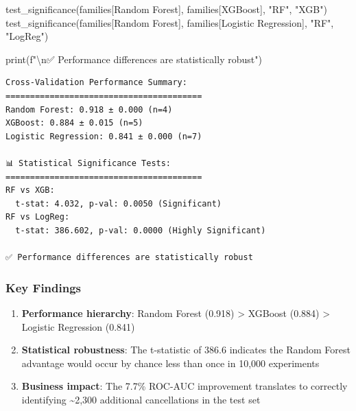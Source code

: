\documentclass[
  letterpaper,
  DIV=11,
  numbers=noendperiod]{scrartcl}
\newenvironment{Shaded}{\begin{snugshade}}{\end{snugshade}}
\newcommand{\BuiltInTok}[1]{\textcolor[rgb]{0.00,0.23,0.31}{#1}}
\newcommand{\CharTok}[1]{\textcolor[rgb]{0.13,0.47,0.30}{#1}}
\newcommand{\NormalTok}[1]{\textcolor[rgb]{0.00,0.23,0.31}{#1}}
\newcommand{\SpecialStringTok}[1]{\textcolor[rgb]{0.13,0.47,0.30}{#1}}
\newcommand{\StringTok}[1]{\textcolor[rgb]{0.13,0.47,0.30}{#1}}
\renewenvironment{Shaded}{%
  \begin{tcolorbox}[%
    enhanced,%
    colback=codebg,%
    colframe=codebg,%
    borderline west={3pt}{0pt}{sectionblue},%
    fontupper=\small\ttfamily,%
    boxrule=0pt,%
    arc=0pt,%
    boxsep=5pt,%
    left=2mm,%
    right=2mm,%
    top=2mm,%
    bottom=2mm%
  ]%
}{%
  \end{tcolorbox}%
}
\begin{document}
\begin{Shaded}
\begin{Highlighting}[]
\NormalTok{test\_significance(families[}\StringTok{\textquotesingle{}Random Forest\textquotesingle{}}\NormalTok{], families[}\StringTok{\textquotesingle{}XGBoost\textquotesingle{}}\NormalTok{], }
                 \StringTok{"RF"}\NormalTok{, }\StringTok{"XGB"}\NormalTok{)}
\NormalTok{test\_significance(families[}\StringTok{\textquotesingle{}Random Forest\textquotesingle{}}\NormalTok{], }
\NormalTok{                 families[}\StringTok{\textquotesingle{}Logistic Regression\textquotesingle{}}\NormalTok{], }\StringTok{"RF"}\NormalTok{, }\StringTok{"LogReg"}\NormalTok{)}


\BuiltInTok{print}\NormalTok{(}\SpecialStringTok{f"}\CharTok{\textbackslash{}n}\SpecialStringTok{✅ Performance differences are statistically robust"}\NormalTok{)}
\end{Highlighting}
\end{Shaded}

\begin{verbatim}
Cross-Validation Performance Summary:
========================================
Random Forest: 0.918 ± 0.000 (n=4)
XGBoost: 0.884 ± 0.015 (n=5)
Logistic Regression: 0.841 ± 0.000 (n=7)

📊 Statistical Significance Tests:
========================================
RF vs XGB:
  t-stat: 4.032, p-val: 0.0050 (Significant)
RF vs LogReg:
  t-stat: 386.602, p-val: 0.0000 (Highly Significant)

✅ Performance differences are statistically robust
\end{verbatim}

\subsubsection{Key Findings}\label{key-findings}

\begin{enumerate}
\def\labelenumi{\arabic{enumi}.}
\item
  \textbf{Performance hierarchy}: Random Forest (0.918) \textgreater{}
  XGBoost (0.884) \textgreater{} Logistic Regression (0.841)
\item
  \textbf{Statistical robustness}: The t-statistic of 386.6 indicates
  the Random Forest advantage would occur by chance less than once in
  10,000 experiments
\item
  \textbf{Business impact}: The 7.7\% ROC-AUC improvement translates to
  correctly identifying \textasciitilde2,300 additional cancellations in
  the test set
\end{enumerate}
\end{document}
